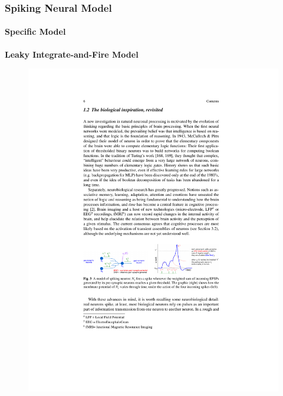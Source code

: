 \documentclass[10pt,aspectratio=43,mathserif, notes]{beamer}
\begin{document}
		\begin{frame}
		    \frametitle{\textbf{Spiking Neural Model}}
            \framesubtitle{Specific Model}
            \noindent\textbf{Leaky Integrate-and-Fire Model}
            \begin{figure}[h]
            \centering
            \includegraphics[width=1\linewidth]{image/SRM.pdf}
            \end{figure}

        \end{frame}
\end{document}
